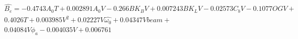 \begin{equation} \label{eq:polynom_complex}
\begin{aligned} 
 \hat{B_{e}} = - 0.4743 A_{0} T +  
 0.002891 A_{0} V - 0.266 BK_{B} V +  
 0.007243 BK_{L} V - 0.02573 C_{b} V - 0.1077 OG V + \\ 
 0.4026 T +  
 0.003985 V^{2} +  
 0.02227 V \hat{\omega_0} +  
 0.04347 V beam +  \\
 0.04084 V \phi_{a} - 0.004035 V +  
 0.006761  
 \end{aligned}
\end{equation}
